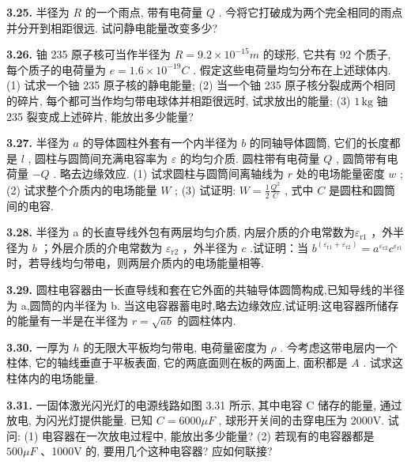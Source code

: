 \vfill
\newpage

\textbf{3.25.} 半径为 $R$ 的一个雨点, 带有电荷量 $Q$ . 今将它打破成为两个完全相同的雨点并分开到相距很远. 试问静电能量改变多少?

\vfill
\newpage

\textbf{3.26.} 铀 235 原子核可当作半径为 $R=9.2\times10^{-15}m$ 的球形, 它共有 92 个质子, 每个质子的电荷量为 $e=1.6\times10^{-19}C$ . 假定这些电荷量均匀分布在上述球体内. (1) 试求一个铀 235 原子核的静电能量; (2) 当一个铀 235 原子核分裂成两个相同的碎片, 每个都可当作均匀带电球体并相距很远时, 试求放出的能量; (3) $1\,\mathrm{kg}$ 铀 235 裂变成上述碎片, 能放出多少能量?

\vfill
\newpage

\textbf{3.27.} 半径为 $a$ 的导体圆柱外套有一个内半径为 $b$ 的同轴导体圆筒, 它们的长度都是 $l$ , 圆柱与圆筒间充满电容率为 $\varepsilon$ 的均匀介质. 圆柱带有电荷量 $Q$ , 圆筒带有电荷量 $-Q$ . 略去边缘效应. (1) 试求圆柱与圆筒间离轴线为 $r$ 处的电场能量密度 $w$ ; (2) 试求整个介质内的电场能量 $W$ ; (3) 试证明: $\displaystyle W = \frac{1}{2} \frac{Q^2}{C}$ , 式中 $C$ 是圆柱和圆筒间的电容.

\vfill
\newpage

\textbf{3.28.} 半径为 a 的长直导线外包有两层均匀介质, 内层介质的介电常数为$\varepsilon_{\mathrm{r1}}$ ，外半径为 $b$ ；外层介质的介电常数为 $\varepsilon_{\mathrm{r2}}$ ，外半径为 $c$ .试证明：当 $b^{(\varepsilon_{\mathrm{r1}} + \varepsilon_{\mathrm{r2}})} = a^{\varepsilon_{\mathrm{r2}}}c^{\varepsilon_{\mathrm{r1}}}$ 时，若导线均匀带电，则两层介质内的电场能量相等.

\vfill
\newpage

\textbf{3.29.} 圆柱电容器由一长直导线和套在它外面的共轴导体圆筒构成,已知导线的半径为 a,圆筒的内半径为 b. 当这电容器蓄电时,略去边缘效应,试证明:这电容器所储存的能量有一半是在半径为 $r=\sqrt{ab}$ 的圆柱体内.

\vfill
\newpage

\textbf{3.30.} 一厚为 $h$ 的无限大平板均匀带电, 电荷量密度为 $\rho$ . 今考虑这带电层内一个柱体, 它的轴线垂直于平板表面, 它的两底面则在板的两面上, 面积都是 $A$ . 试求这柱体内的电场能量.

\vfill
\newpage

\textbf{3.31.} 一固体激光闪光灯的电源线路如图 3.31 所示, 其中电容 C 储存的能量, 通过放电, 为闪光灯提供能量. 已知 $C = 6000 \mu F$ , 球形开关间的击穿电压为 2000V. 试问: (1) 电容器在一次放电过程中, 能放出多少能量? (2) 若现有的电容器都是 $500 \mu F$ 、1000V 的, 要用几个这种电容器? 应如何联接?

